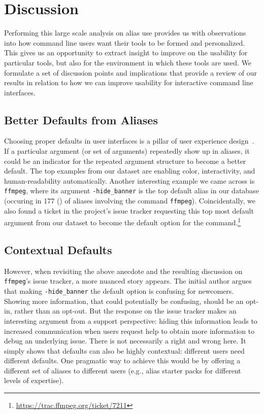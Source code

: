 \section{Discussion}

Performing this large scale analysis on alias use provides us with observations into how command line users want their tools to be formed and personalized.
This gives us an opportunity to extract insight to improve on the usability for particular tools, but also for the environment in which these tools are used.
We formulate a set of discussion points and implications that provide a review of our results in relation to how we can improve usability for interactive command line interfaces.

\subsection{Better Defaults from Aliases}

Choosing proper defaults in user interfaces is a pillar of user experience design~\cite{nielsen2005power}. 
If a particular argument (or set of arguments) repeatedly show up in aliases, it could be an indicator for the repeated argument structure to become a better default. 
The top examples from our dataset are enabling color, interactivity, and human-readability automatically.
Another interesting example we came across is \verb|ffmpeg|, where its argument \verb|-hide_banner| is the top default alias in our database (occuring in \num{177} () of aliases involving the command \verb|ffmpeg|).
Coincidentally, we also found a ticket in the project's issue tracker requesting this top most default argument from our dataset to become the default option for the command.\footnote{\url{https://trac.ffmpeg.org/ticket/7211}}

\subsection{Contextual Defaults}

However, when revisiting the above anecdote and the resulting discussion on \verb|ffmpeg|'s issue tracker, a more nuanced story appears.
The initial author argues that making \verb|-hide_banner| the default option is confusing for newcomers.
Showing more information, that could potentially be confusing, should be an opt-in, rather than an opt-out.
But the response on the issue tracker makes an interesting argument from a support perspective: hiding this information leads to increased communication when users request help to obtain more information to debug an underlying issue.
There is not necessarily a right and wrong here.
It simply shows that defaults can also be highly contextual: different users need different defaults.
One pragmatic way to achieve this would be by offering a different set of aliases to different users (e.g., alias starter packs for different levels of expertise).

